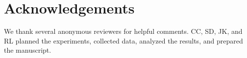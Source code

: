 \documentclass[reprint,amsmath,amssymb,aps,twoside]{revtex4-2}
\begin{document}
\section{Acknowledgements}
We thank several anonymous reviewers for helpful comments. CC, SD, JK, and RL planned the experiments, collected data, analyzed the results, and prepared the manuscript.
%





\end{document}
